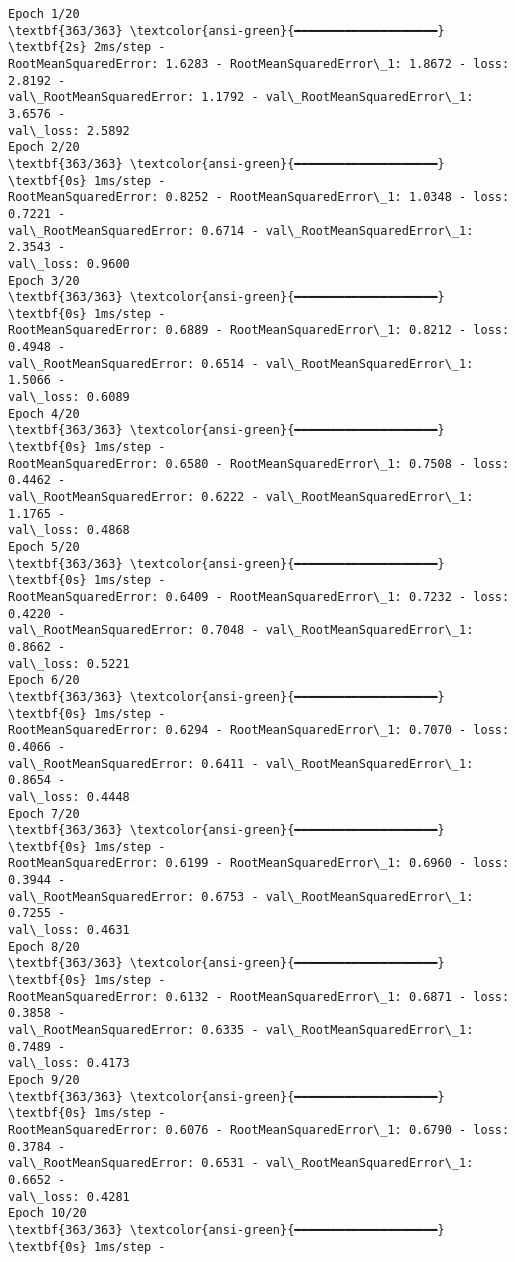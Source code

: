\documentclass[12pt letter]{report}
\begin{document}
    \begin{Verbatim}[commandchars=\\\{\}]
Epoch 1/20
\textbf{363/363} \textcolor{ansi-green}{━━━━━━━━━━━━━━━━━━━━} \textbf{2s} 2ms/step -
RootMeanSquaredError: 1.6283 - RootMeanSquaredError\_1: 1.8672 - loss: 2.8192 -
val\_RootMeanSquaredError: 1.1792 - val\_RootMeanSquaredError\_1: 3.6576 -
val\_loss: 2.5892
Epoch 2/20
\textbf{363/363} \textcolor{ansi-green}{━━━━━━━━━━━━━━━━━━━━} \textbf{0s} 1ms/step -
RootMeanSquaredError: 0.8252 - RootMeanSquaredError\_1: 1.0348 - loss: 0.7221 -
val\_RootMeanSquaredError: 0.6714 - val\_RootMeanSquaredError\_1: 2.3543 -
val\_loss: 0.9600
Epoch 3/20
\textbf{363/363} \textcolor{ansi-green}{━━━━━━━━━━━━━━━━━━━━} \textbf{0s} 1ms/step -
RootMeanSquaredError: 0.6889 - RootMeanSquaredError\_1: 0.8212 - loss: 0.4948 -
val\_RootMeanSquaredError: 0.6514 - val\_RootMeanSquaredError\_1: 1.5066 -
val\_loss: 0.6089
Epoch 4/20
\textbf{363/363} \textcolor{ansi-green}{━━━━━━━━━━━━━━━━━━━━} \textbf{0s} 1ms/step -
RootMeanSquaredError: 0.6580 - RootMeanSquaredError\_1: 0.7508 - loss: 0.4462 -
val\_RootMeanSquaredError: 0.6222 - val\_RootMeanSquaredError\_1: 1.1765 -
val\_loss: 0.4868
Epoch 5/20
\textbf{363/363} \textcolor{ansi-green}{━━━━━━━━━━━━━━━━━━━━} \textbf{0s} 1ms/step -
RootMeanSquaredError: 0.6409 - RootMeanSquaredError\_1: 0.7232 - loss: 0.4220 -
val\_RootMeanSquaredError: 0.7048 - val\_RootMeanSquaredError\_1: 0.8662 -
val\_loss: 0.5221
Epoch 6/20
\textbf{363/363} \textcolor{ansi-green}{━━━━━━━━━━━━━━━━━━━━} \textbf{0s} 1ms/step -
RootMeanSquaredError: 0.6294 - RootMeanSquaredError\_1: 0.7070 - loss: 0.4066 -
val\_RootMeanSquaredError: 0.6411 - val\_RootMeanSquaredError\_1: 0.8654 -
val\_loss: 0.4448
Epoch 7/20
\textbf{363/363} \textcolor{ansi-green}{━━━━━━━━━━━━━━━━━━━━} \textbf{0s} 1ms/step -
RootMeanSquaredError: 0.6199 - RootMeanSquaredError\_1: 0.6960 - loss: 0.3944 -
val\_RootMeanSquaredError: 0.6753 - val\_RootMeanSquaredError\_1: 0.7255 -
val\_loss: 0.4631
Epoch 8/20
\textbf{363/363} \textcolor{ansi-green}{━━━━━━━━━━━━━━━━━━━━} \textbf{0s} 1ms/step -
RootMeanSquaredError: 0.6132 - RootMeanSquaredError\_1: 0.6871 - loss: 0.3858 -
val\_RootMeanSquaredError: 0.6335 - val\_RootMeanSquaredError\_1: 0.7489 -
val\_loss: 0.4173
Epoch 9/20
\textbf{363/363} \textcolor{ansi-green}{━━━━━━━━━━━━━━━━━━━━} \textbf{0s} 1ms/step -
RootMeanSquaredError: 0.6076 - RootMeanSquaredError\_1: 0.6790 - loss: 0.3784 -
val\_RootMeanSquaredError: 0.6531 - val\_RootMeanSquaredError\_1: 0.6652 -
val\_loss: 0.4281
Epoch 10/20
\textbf{363/363} \textcolor{ansi-green}{━━━━━━━━━━━━━━━━━━━━} \textbf{0s} 1ms/step -

\end{Verbatim}
\end{document}
